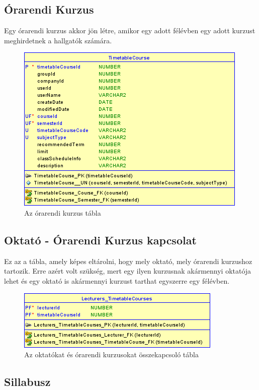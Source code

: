 \documentclass[hidelinks, 12pt, a4paper]{report}
\begin{document}
\subsection{Órarendi Kurzus}

Egy órarendi kurzus akkor jön létre, amikor egy adott félévben egy adott kurzust meghirdetnek a hallgatók számára.

\begin{figure}[H]
    \centering
	\includegraphics{timetable_course.png}
	\caption{Az órarendi kurzus tábla}
\end{figure}

\subsection{Oktató - Órarendi Kurzus kapcsolat}

Ez az a tábla, amely képes eltárolni, hogy mely oktató, mely órarendi kurzushoz tartozik. Erre azért volt szükség, mert egy ilyen kurzusnak akármennyi oktatója lehet  és egy oktató is akármennyi kurzust tarthat egyszerre egy félévben.

\begin{figure}[H]
    \centering
	\includegraphics{lecturer_timetable_course.png}
	\caption{Az oktatókat és órarendi kurzusokat összekapcsoló tábla}
\end{figure}

\subsection{Sillabusz}
\end{document}
